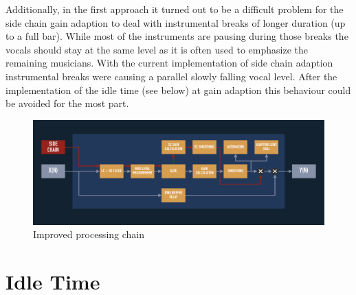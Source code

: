 Additionally, in the first approach it turned out to be a difficult problem for the side chain gain adaption to deal with instrumental breaks of longer duration (up to a full bar). While most of the instruments are pausing during those breaks the vocals should stay at the same level as it is often used to emphasize the remaining musicians. With the current implementation of side chain adaption instrumental breaks were causing a parallel slowly falling vocal level. After the implementation of the idle time (see below) at gain adaption this behaviour could be avoided for the most part.\\

\begin{figure}
\includegraphics[width=\textwidth]{images/chain02}
\caption{Improved processing chain}
\label{Chain2}
\end{figure}

\section{Idle Time}

